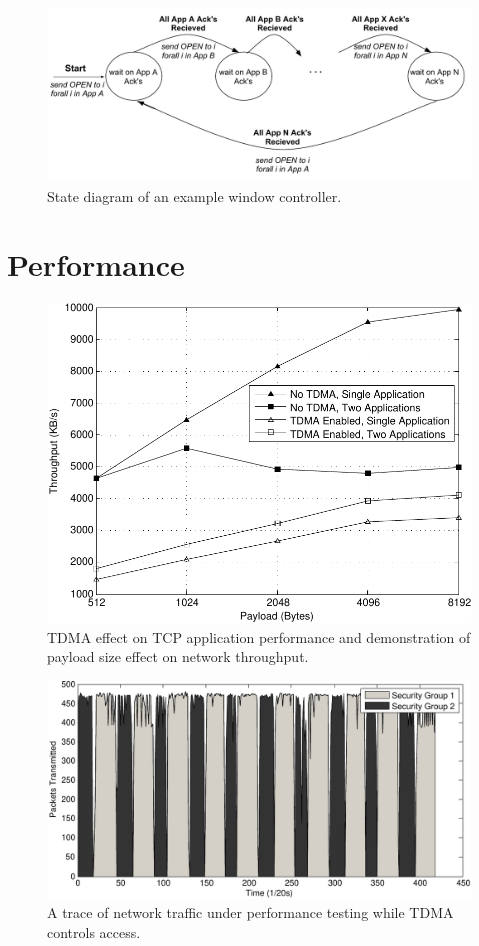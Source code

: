 \documentclass[oneside,12pt]{memoir}
\begin{document}
\begin{figure}
\centering
\includegraphics[scale=0.62]{control_state_diagram.pdf}
\caption{State diagram of an example window controller.}
\label{fig:control_state_diagram}
\end{figure}


\chapter{Performance}

\begin{figure}
\centerline{\includegraphics{TCP_Performance.pdf}}
\caption{TDMA effect on TCP application performance and demonstration of payload size effect on network throughput.}
\label{fig:TCP_Performance}
\end{figure}

\begin{figure}
\centering
\includegraphics[scale=0.8]{Switching.pdf}
\caption{A trace of network traffic under performance testing while TDMA controls access.}
\label{fig:Switching}
\end{figure}
\end{document}
